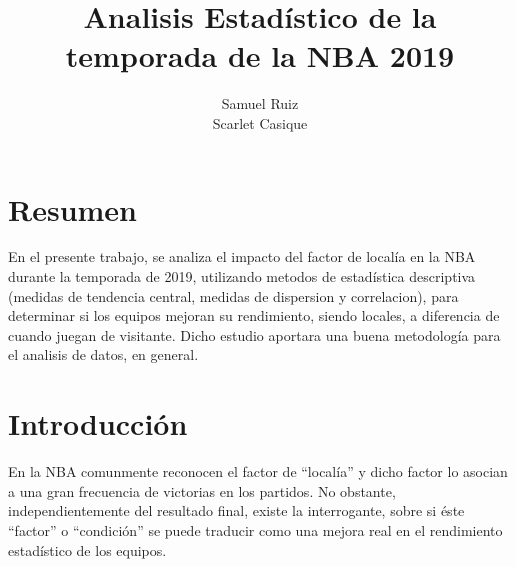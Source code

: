 \documentclass[oneside,11pt]{Latex/Classes/PhDthesisPSnPDF}
\title{Analisis Estadístico de la temporada de la NBA 2019}
\author{Samuel Ruiz \\ Scarlet Casique}
\begin{document}
\maketitle

\frontmatter


\setcounter{secnumdepth}{3}
\setcounter{tocdepth}{3}

\tableofcontents



\cleardoublepage

  \cleardoublepage       %
  \chapter*{Resumen}     %
  
  En el presente trabajo, se analiza el impacto del factor de localía en
la NBA durante la temporada de 2019, utilizando metodos de estadística
descriptiva (medidas de tendencia central, medidas de dispersion y
correlacion), para determinar si los equipos mejoran su rendimiento,
siendo locales, a diferencia de cuando juegan de visitante. Dicho
estudio aportara una buena metodología para el analisis de datos, en
general.             %
  
  \cleardoublepage

\mainmatter
\def\baselinestretch{1.5}

\chapter*{Introducción}

En la NBA comunmente reconocen el factor de ``localía'' y dicho factor
lo asocian a una gran frecuencia de victorias en los partidos. No
obstante, independientemente del resultado final, existe la
interrogante, sobre si éste ``factor'' o ``condición'' se puede traducir
como una mejora real en el rendimiento estadístico de los equipos.
\end{document}
